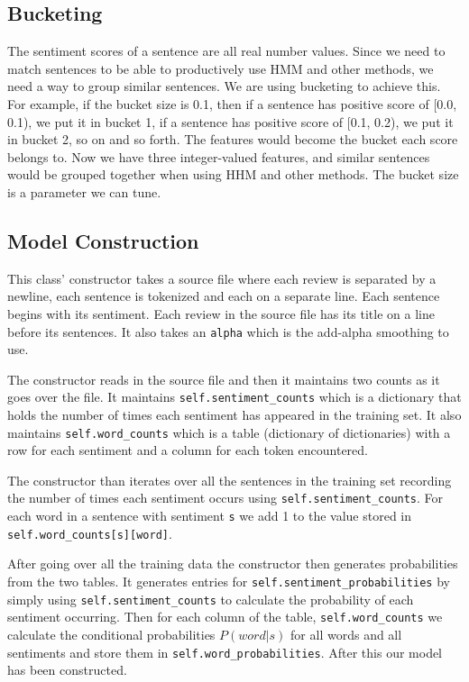 \documentclass{article}
\begin{document}
\subsection{Bucketing}
The sentiment scores of a sentence are all real number values. Since we need to match sentences to be able to productively use HMM and other methods, we need a way to group similar sentences. We are using bucketing to achieve this. For example, if the bucket size is 0.1, then if a sentence has positive score of [0.0, 0.1), we put it in bucket 1, if a sentence has positive score of [0.1, 0.2), we put it in bucket 2, so on and so forth. The features would become the bucket each score belongs to. Now we have three integer-valued features, and similar sentences would be grouped together when using HHM and other methods. The bucket size is a parameter we can tune.

\subsection{Model Construction}

This class' constructor takes a source file where each review is separated by a newline, each sentence is tokenized and each on a separate line. Each sentence begins with its sentiment. Each review in the source file has its title on a line before its sentences. It also takes an \texttt{alpha} which is the add-alpha smoothing to use.

The constructor reads in the source file and then it maintains two counts as it goes over the file. It maintains \texttt{self.sentiment\_counts} which is a dictionary that holds the number of times each sentiment has appeared in the training set. It also maintains \texttt{self.word\_counts} which is a table (dictionary of dictionaries) with a row for each sentiment and a column for each token encountered. 

The constructor than iterates over all the sentences in the training set recording the number of times each sentiment occurs using \texttt{self.sentiment\_counts}. For each word in a sentence with sentiment \texttt{s} we add 1 to the value stored in \texttt{self.word\_counts[s][word]}. 

After going over all the training data the constructor then generates probabilities from the two tables. It generates entries for \texttt{self.sentiment\_probabilities} by simply using \texttt{self.sentiment\_counts} to calculate the probability of each sentiment occurring. Then for each column of the table, \texttt{self.word\_counts} we calculate the conditional probabilities $P(word|s)$ for all words and all sentiments and store them in \texttt{self.word\_probabilities}. After this our model has been constructed.
\end{document}
